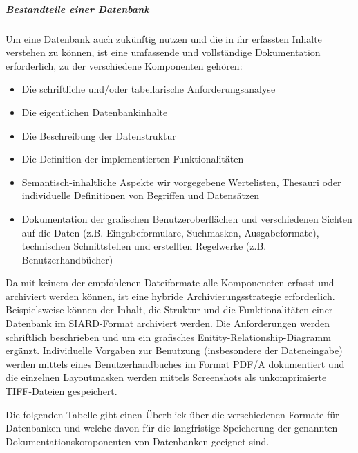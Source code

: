 \subparagraph{Bestandteile einer Datenbank}
Um eine Datenbank auch zukünftig nutzen und die in ihr erfassten Inhalte verstehen zu können, ist eine umfassende und vollständige Dokumentation erforderlich, zu der verschiedene Komponenten gehören:
\begin{itemize}
	\item Die schriftliche und/oder tabellarische Anforderungsanalyse
	\item Die eigentlichen Datenbankinhalte
	\item Die Beschreibung der Datenstruktur
	\item Die Definition der implementierten Funktionalitäten
	\item Semantisch-inhaltliche Aspekte wir vorgegebene Wertelisten, Thesauri oder individuelle Definitionen von Begriffen und Datensätzen
	\item Dokumentation der grafischen Benutzeroberflächen und verschiedenen Sichten auf die Daten (z.B. Eingabeformulare, Suchmasken, Ausgabeformate), technischen Schnittstellen und  erstellten Regelwerke (z.B. Benutzerhandbücher) 
\end{itemize}

Da mit keinem der empfohlenen Dateiformate alle Komponeneten erfasst und archiviert werden können, ist eine hybride Archivierungsstrategie erforderlich. Beispielsweise können der Inhalt, die Struktur und die Funktionalitäten einer Datenbank im SIARD-Format archiviert werden. Die Anforderungen werden schriftlich beschrieben und um ein grafisches Enitity-Relationship-Diagramm ergänzt. Individuelle Vorgaben zur Benutzung (insbesondere der Dateneingabe) werden mittels eines Benutzerhandbuches im Format PDF/A dokumentiert und die einzelnen Layoutmasken werden mittels Screenshots als unkomprimierte TIFF-Dateien gespeichert.

Die folgenden Tabelle gibt einen Überblick über die verschiedenen Formate für Datenbanken und welche davon für die langfristige Speicherung der genannten Dokumentationskomponenten  von Datenbanken geeignet sind.

